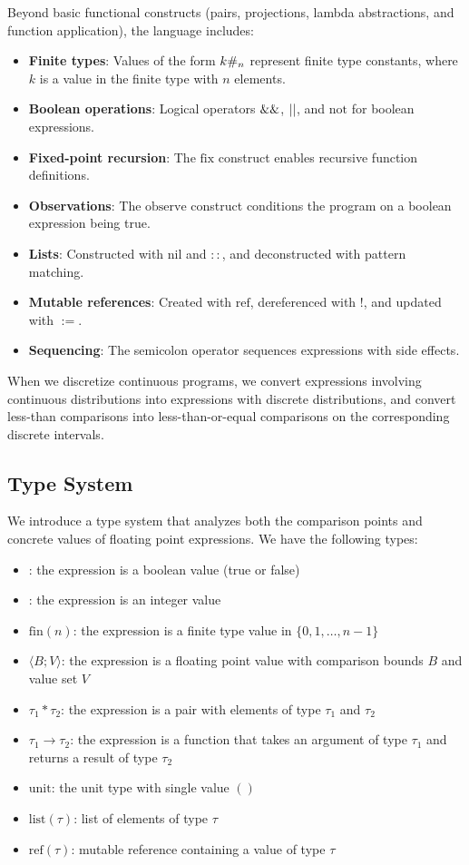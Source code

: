 Beyond basic functional constructs (pairs, projections, lambda abstractions, and function application), the language includes:
\begin{itemize}
\item \textbf{Finite types}: Values of the form $k\#_{n}$ represent finite type constants, where $k$ is a value in the finite type with $n$ elements.
\item \textbf{Boolean operations}: Logical operators $\mathrel{\&\&}$, $\mathrel{||}$, and $\text{not}$ for boolean expressions.
\item \textbf{Fixed-point recursion}: The $\text{fix}$ construct enables recursive function definitions.
\item \textbf{Observations}: The $\text{observe}$ construct conditions the program on a boolean expression being true.
\item \textbf{Lists}: Constructed with $\text{nil}$ and $::$, and deconstructed with pattern matching.
\item \textbf{Mutable references}: Created with $\text{ref}$, dereferenced with $!$, and updated with $:=$.
\item \textbf{Sequencing}: The semicolon operator sequences expressions with side effects.
\end{itemize}

When we discretize continuous programs, we convert expressions involving continuous distributions into expressions with discrete distributions, and convert less-than comparisons into less-than-or-equal comparisons on the corresponding discrete intervals.

\subsection{Type System}\label{sec:type-system}

We introduce a type system that analyzes both the comparison points and concrete values of floating point expressions. We have the following types:
\begin{itemize}
    \item \bool: the expression is a boolean value (true or false)
    \item \intty: the expression is an integer value  
    \item $\text{fin}(n)$: the expression is a finite type value in $\{0, 1, \ldots, n-1\}$
    \item \float$\langle B; V \rangle$: the expression is a floating point value with comparison bounds $B$ and value set $V$
    \item $\tau_1 * \tau_2$: the expression is a pair with elements of type $\tau_1$ and $\tau_2$
    \item $\tau_1 \rightarrow \tau_2$: the expression is a function that takes an argument of type $\tau_1$ and returns a result of type $\tau_2$
    \item $\text{unit}$: the unit type with single value $()$
    \item $\text{list}(\tau)$: list of elements of type $\tau$
    \item $\text{ref}(\tau)$: mutable reference containing a value of type $\tau$
\end{itemize}

